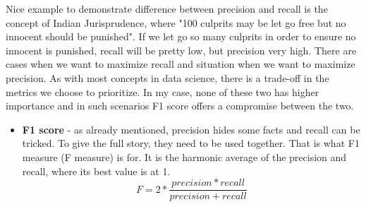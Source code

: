 Nice example to demonstrate difference between precision and recall is the concept of Indian Jurisprudence, where "100 culprits may be let go free but no innocent should be punished". If we let go so many culprits in order to ensure no innocent is punished, recall will be pretty low, but precision very high. There are cases when we want to maximize recall and situation when we want to maximize precision. As with most concepts in data science, there is a trade-off in the metrics we choose to prioritize. In my case, none of these two has higher importance and in such scenarios F1 score offers a compromise between the two.
\begin{itemize}
\item \textbf{F1 score} - as already mentioned, precision hides some facts and recall can be tricked. To give the full story, they need to be used together. That is what F1 measure (F measure) is for. It is the harmonic average of the precision and recall, where its best value is at 1.
\[ F = 2 * \frac{precision * recall}{precision + recall}\]
\end{itemize}